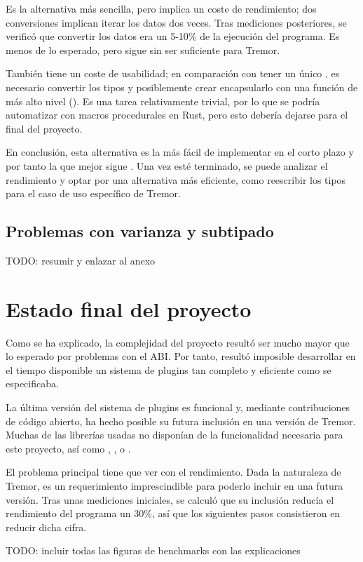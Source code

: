 Es la alternativa más sencilla, pero implica un coste de rendimiento; dos
conversiones implican iterar los datos dos veces. Tras mediciones posteriores,
se verificó que convertir los datos era un 5-10\% de la ejecución del programa.
Es menos de lo esperado, pero sigue sin ser suficiente para Tremor.

También tiene un coste de usabilidad; en comparación con tener un único
, es necesario convertir los tipos y posiblemente crear encapsularlo
con una función de más alto nivel (). Es una tarea
relativamente trivial, por lo que se podría automatizar con macros procedurales
en Rust, pero esto debería dejarse para el final del proyecto.

En conclusión, esta alternativa es la más fácil de implementar en el corto
plazo y por tanto la que mejor sigue \work. Una vez esté terminado, se puede
analizar el rendimiento y optar por una alternativa más eficiente, como
reescribir los tipos para el caso de uso específico de Tremor.

\subsection{Problemas con varianza y subtipado}

TODO: resumir y enlazar al anexo

\section{Estado final del proyecto}

Como se ha explicado, la complejidad del proyecto resultó ser mucho mayor que lo
esperado por problemas con el ABI. Por tanto, resultó imposible desarrollar en
el tiempo disponible un sistema de plugins tan completo y eficiente como se
especificaba.

La última versión del sistema de plugins es funcional y, mediante contribuciones
de código abierto, ha hecho posible su futura inclusión en una versión de
Tremor. Muchas de las librerías usadas no disponían de la funcionalidad
necesaria para este proyecto, así como , ,
 o .

El problema principal tiene que ver con el rendimiento. Dada la naturaleza de
Tremor, es un requerimiento imprescindible para poderlo incluir en una futura
versión. Tras unas mediciones iniciales, se calculó que su inclusión reducía el
rendimiento del programa un 30\%, así que los siguientes pasos consistieron en
reducir dicha cifra.

TODO: incluir todas las figuras de benchmarks con las explicaciones
